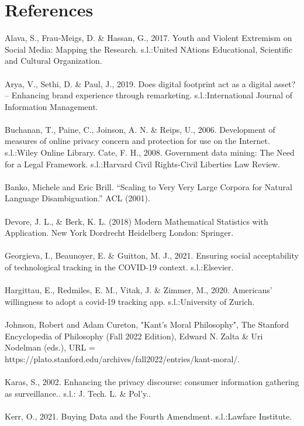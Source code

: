 \documentclass[11pt]{article}
\begin{document}
\section{References}
Alava, S., Frau-Meigs, D. \& Hassan, G., 2017. Youth and Violent Extremism on Social Media: Mapping the Research. s.l.:United NAtions Educational, Scientific and Cultural Organization.
\\ \\
Arya, V., Sethi, D. \& Paul, J., 2019. Does digital footprint act as a digital asset? – Enhancing brand experience through remarketing. s.l.:International Journal of Information Management.
\\ \\
Buchanan, T., Paine, C., Joinson, A. N. \& Reips, U., 2006. Development of measures of online privacy concern and protection for use on the Internet. s.l.:Wiley Online Library.
Cate, F. H., 2008. Government data mining: The Need for a Legal Framework. s.l.:Harvard Civil Rights-Civil Liberties Law Review.
\\ \\
Banko, Michele and Eric Brill. “Scaling to Very Very Large Corpora for Natural Language Disambiguation.” ACL (2001).
\\ \\
Devore, J. L., \& Berk, K. L. (2018) Modern Mathematical Statistics with Application. New York Dordrecht Heidelberg London: Springer.
\\ \\
Georgieva, I., Beaunoyer, E. \& Guitton, M. J., 2021. Ensuring social acceptability of technological tracking in the COVID-19 context. s.l.:Elsevier.
\\ \\
Hargittau, E., Redmiles, E. M., Vitak, J. \& Zimmer, M., 2020. Americans' willingness to adopt a covid-19 tracking app. s.l.:University of Zurich.
\\ \\
Johnson, Robert and Adam Cureton, "Kant’s Moral Philosophy", The Stanford Encyclopedia of Philosophy (Fall 2022 Edition), Edward N. Zalta \& Uri Nodelman (eds.), URL = https://plato.stanford.edu/archives/fall2022/entries/kant-moral/. 
\\ \\
Karas, S., 2002. Enhancing the privacy discourse: consumer information gathering as surveillance.. s.l.: J. Tech. L. \& Pol'y..
\\ \\
Kerr, O., 2021. Buying Data and the Fourth Amendment. s.l.:Lawfare Institute.
\end{document}
